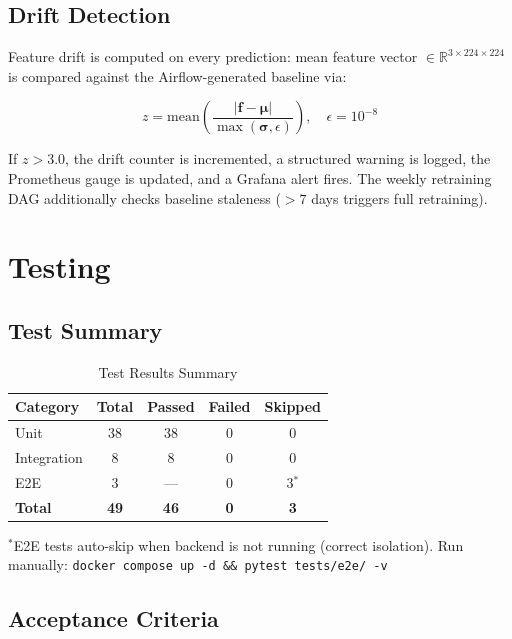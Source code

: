 \documentclass[conference]{IEEEtran}
\begin{document}
\subsection{Drift Detection}

Feature drift is computed on every prediction: mean feature vector $\in \mathbb{R}^{3 \times 224 \times 224}$ is compared against the Airflow-generated baseline via:

\[
z = \text{mean}\!\left(\frac{|\mathbf{f} - \boldsymbol{\mu}|}{\max(\boldsymbol{\sigma}, \epsilon)}\right), \quad \epsilon = 10^{-8}
\]

If $z > 3.0$, the drift counter is incremented, a structured warning is logged, the Prometheus gauge is updated, and a Grafana alert fires. The weekly retraining DAG additionally checks baseline staleness ($>7$ days triggers full retraining).

\section{Testing}
\label{sec:testing}

\subsection{Test Summary}

\begin{table}[H]
\centering
\caption{Test Results Summary}
\label{tab:tests}
\begin{tabular}{@{}lcccc@{}}
\toprule
\textbf{Category} & \textbf{Total} & \textbf{Passed} & \textbf{Failed} & \textbf{Skipped} \\
\midrule
Unit        & 38 & 38 & 0 & 0 \\
Integration &  8 &  8 & 0 & 0 \\
E2E         &  3 & —  & 0 & 3$^*$ \\
\midrule
\textbf{Total} & \textbf{49} & \textbf{46} & \textbf{0} & \textbf{3} \\
\bottomrule
\end{tabular}
\end{table}

\footnotesize{$^*$E2E tests auto-skip when backend is not running (correct isolation). Run manually: \texttt{docker compose up -d \&\& pytest tests/e2e/ -v}}

\subsection{Acceptance Criteria}
\end{document}
